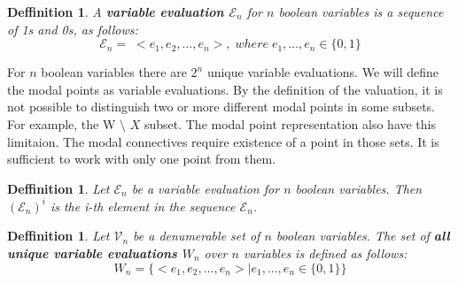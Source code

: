 \documentclass{article}
\newcommand\V{\mathcal{V}}
\newcommand\E{\mathcal{E}}
\newcommand\VX{X}
\newtheorem{defn}[theorem]{Deffinition}
\begin{document}
		
		
		\begin{defn}
			A \textbf{variable evaluation $\E_n$} for $n$ boolean variables is a sequence of 1s and 0s, as follows:
			\begin{equation}
				\E_n = \; < e_1, e_2, \ldots , e_n >, \; where \; e_1, \ldots, e_n \in \{0, 1 \}
			\end{equation}
		\end{defn}

		For $n$ boolean variables there are $2^n$ unique variable evaluations. We will define the modal points as variable evaluations. By the definition of the valuation, it is not possible to distinguish two or more different modal points in some subsets. For example, the W $\setminus$ $\VX$ subset. The modal point representation also have this limitaion. The modal connectives require existence of a point in those sets. It is sufficient to work with only one point from them.

		\begin{defn}
			Let $\E_n$ be a variable evaluation for $n$ boolean variables. Then $(\E_n)^i$ is the i-th element in the sequence $\E_n$.
		\end{defn}

		\begin{defn}
			Let $\V_n$ be a denumerable set of $n$ boolean variables. The set of \textbf{all unique variable evaluations $W_n$} over $n$ variables is defined as follows:
			\begin{equation}
				\label{all-unique-points}
				W_n = \{< e_1, e_2, \ldots , e_n > \mid e_1, \ldots, e_n \in \{0, 1 \} \}
			\end{equation}
		\end{defn}
\end{document}
